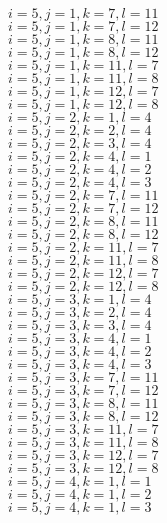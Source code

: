 \documentclass[14pt]{article}
\begin{document}
    $i=5,j=1,k=7,l=11 $ \\ 
    $i=5,j=1,k=7,l=12 $ \\ 
    $i=5,j=1,k=8,l=11 $ \\ 
    $i=5,j=1,k=8,l=12 $ \\ 
    $i=5,j=1,k=11,l=7 $ \\ 
    $i=5,j=1,k=11,l=8 $ \\ 
    $i=5,j=1,k=12,l=7 $ \\ 
    $i=5,j=1,k=12,l=8 $ \\ 
    $i=5,j=2,k=1,l=4 $ \\ 
    $i=5,j=2,k=2,l=4 $ \\ 
    $i=5,j=2,k=3,l=4 $ \\ 
    $i=5,j=2,k=4,l=1 $ \\ 
    $i=5,j=2,k=4,l=2 $ \\ 
    $i=5,j=2,k=4,l=3 $ \\ 
    $i=5,j=2,k=7,l=11 $ \\ 
    $i=5,j=2,k=7,l=12 $ \\ 
    $i=5,j=2,k=8,l=11 $ \\ 
    $i=5,j=2,k=8,l=12 $ \\ 
    $i=5,j=2,k=11,l=7 $ \\ 
    $i=5,j=2,k=11,l=8 $ \\ 
    $i=5,j=2,k=12,l=7 $ \\ 
    $i=5,j=2,k=12,l=8 $ \\ 
    $i=5,j=3,k=1,l=4 $ \\ 
    $i=5,j=3,k=2,l=4 $ \\ 
    $i=5,j=3,k=3,l=4 $ \\ 
    $i=5,j=3,k=4,l=1 $ \\ 
    $i=5,j=3,k=4,l=2 $ \\ 
    $i=5,j=3,k=4,l=3 $ \\ 
    $i=5,j=3,k=7,l=11 $ \\ 
    $i=5,j=3,k=7,l=12 $ \\ 
    $i=5,j=3,k=8,l=11 $ \\ 
    $i=5,j=3,k=8,l=12 $ \\ 
    $i=5,j=3,k=11,l=7 $ \\ 
    $i=5,j=3,k=11,l=8 $ \\ 
    $i=5,j=3,k=12,l=7 $ \\ 
    $i=5,j=3,k=12,l=8 $ \\ 
    $i=5,j=4,k=1,l=1 $ \\ 
    $i=5,j=4,k=1,l=2 $ \\ 
    $i=5,j=4,k=1,l=3 $ \\ 
\end{document}
